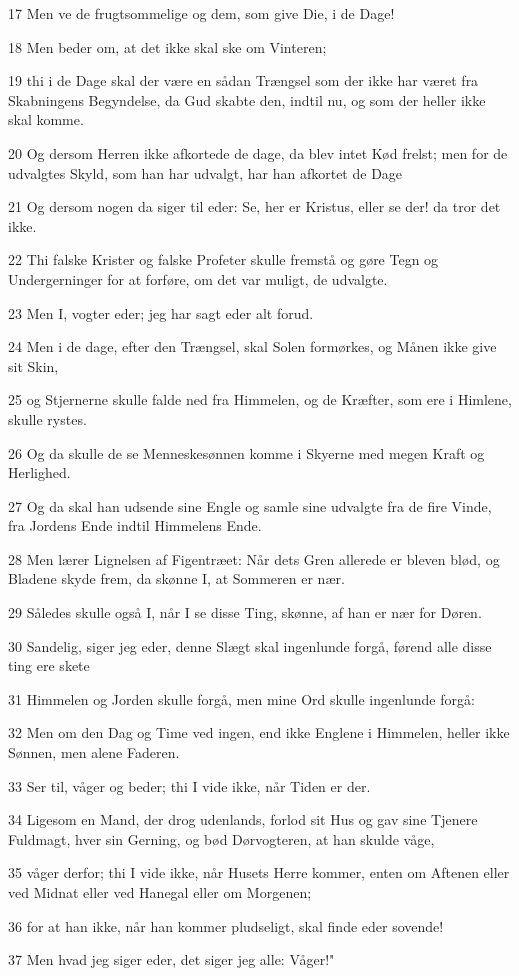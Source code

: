 \par 17 Men ve de frugtsommelige og dem, som give Die, i de Dage!
\par 18 Men beder om, at det ikke skal ske om Vinteren;
\par 19 thi i de Dage skal der være en sådan Trængsel som der ikke har været fra Skabningens Begyndelse, da Gud skabte den, indtil nu, og som der heller ikke skal komme.
\par 20 Og dersom Herren ikke afkortede de dage, da blev intet Kød frelst; men for de udvalgtes Skyld, som han har udvalgt, har han afkortet de Dage
\par 21 Og dersom nogen da siger til eder: Se, her er Kristus, eller se der! da tror det ikke.
\par 22 Thi falske Krister og falske Profeter skulle fremstå og gøre Tegn og Undergerninger for at forføre, om det var muligt, de udvalgte.
\par 23 Men I, vogter eder; jeg har sagt eder alt forud.
\par 24 Men i de dage, efter den Trængsel, skal Solen formørkes, og Månen ikke give sit Skin,
\par 25 og Stjernerne skulle falde ned fra Himmelen, og de Kræfter, som ere i Himlene, skulle rystes.
\par 26 Og da skulle de se Menneskesønnen komme i Skyerne med megen Kraft og Herlighed.
\par 27 Og da skal han udsende sine Engle og samle sine udvalgte fra de fire Vinde, fra Jordens Ende indtil Himmelens Ende.
\par 28 Men lærer Lignelsen af Figentræet: Når dets Gren allerede er bleven blød, og Bladene skyde frem, da skønne I, at Sommeren er nær.
\par 29 Således skulle også I, når I se disse Ting, skønne, af han er nær for Døren.
\par 30 Sandelig, siger jeg eder, denne Slægt skal ingenlunde forgå, førend alle disse ting ere skete
\par 31 Himmelen og Jorden skulle forgå, men mine Ord skulle ingenlunde forgå:
\par 32 Men om den Dag og Time ved ingen, end ikke Englene i Himmelen, heller ikke Sønnen, men alene Faderen.
\par 33 Ser til, våger og beder; thi I vide ikke, når Tiden er der.
\par 34 Ligesom en Mand, der drog udenlands, forlod sit Hus og gav sine Tjenere Fuldmagt, hver sin Gerning, og bød Dørvogteren, at han skulde våge,
\par 35 våger derfor; thi I vide ikke, når Husets Herre kommer, enten om Aftenen eller ved Midnat eller ved Hanegal eller om Morgenen;
\par 36 for at han ikke, når han kommer pludseligt, skal finde eder sovende!
\par 37 Men hvad jeg siger eder, det siger jeg alle: Våger!"

